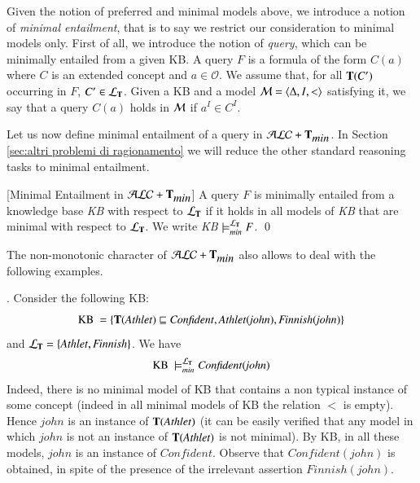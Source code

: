 \documentclass[a4paper, 11pt, oneside]{elsarticle}
\newcommand{\tip}{{\bf T}}
\newcommand{\alctmin}{\mathcal{ALC}+\tip_{\mbox{\em min}}}
\newcommand {\emme} {\begin{mathcal}M\end{mathcal}}
\newcommand{\sqset}{\sqsubseteq}
\newcommand {\ellet} {\mathcal{L}_{\bf T}}
\newcommand {\sx} {\langle}
\newcommand {\dx} {\rangle}
\newenvironment{definition}
{\begin{defi} \rm}{\qed \end{defi}}
\newcounter{posu}
\newtheorem{definition}[posu]{Definition}
\begin{document}
\noindent Given the notion of preferred and minimal models above, we introduce a notion of \emph{minimal entailment}, that is to say we restrict our consideration to minimal models only. First of all,
we introduce the notion of \emph{query}, which can be minimally entailed from a given KB.
A query $F$ is  a formula of the form $C(a)$ where $C$ is an extended concept and $a \in \mathcal{O}$.
We assume that, for all $\tip(C')$ occurring in $F$, $C' \in \ellet$.
Given a KB and a model $\emme=\sx \Delta, I, < \dx$ satisfying it, we say that a query $C(a)$ holds in $\emme$ if $a^I \in C^I$.

Let us now define minimal entailment of a query in $\alctmin$. In
Section \ref{sec:altri problemi di ragionamento} we will reduce
the other  standard reasoning tasks to minimal entailment.

\begin{definition}[Minimal Entailment in $\alctmin$]\label{LogicalConsequenceALCTMIN}
A query $F$  is minimally entailed from a
knowledge base \emph{KB} with respect to ${\ellet}$ if it holds in all
models of \emph{KB} that are minimal with respect to ${\ellet}$. We write \emph{KB}
$\models_{min}^{\ellet} F$.
\end{definition}


\noindent The non-monotonic character of $\alctmin$ also allows to deal with the following examples.

\vspace{0.5cm}


.
Consider the following KB:
$$\mbox{KB} \ = \{ \tip(\mathit{Athlet}) \sqset
\mathit{Confident}, \mathit{Athlet}(\mathit{john}),
\mathit{Finnish}(\mathit{john})\}$$ and ${\ellet}=
\{\mathit{Athlet}, \mathit{Finnish}\}$. We have $$\mbox{KB} \
\models_{min}^{\ellet} \mathit{Confident}(\mathit{john})$$
Indeed, there is no minimal model of KB that contains a non typical instance of some concept (indeed in all minimal models of KB the relation $<$ is empty).
Hence $\mathit{john}$ is an instance of $\tip(\mathit{Athlet})$
(it can be easily verified that any model in which $\mathit{john}$
is not an instance of $\tip(\mathit{Athlet})$ is not minimal).  By
KB, in all these models, $\mathit{john}$ is an instance of
$\mathit{Confident}$. Observe that $\mathit{Confident}(\mathit{john})$ is obtained, in spite of the
presence of the irrelevant assertion
$\mathit{Finnish}(\mathit{john})$.


\vspace{0.35cm}
\end{document}
